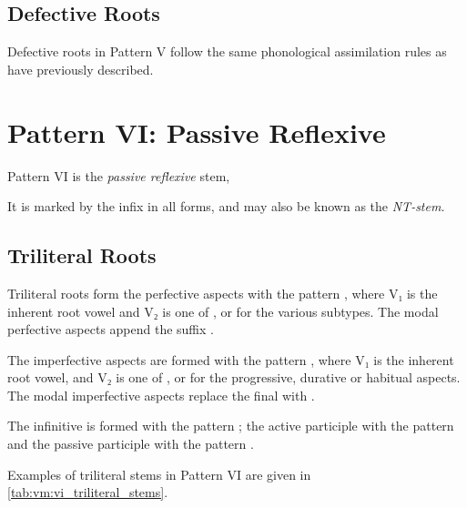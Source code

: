 \documentclass[grammar]{subfiles}
\begin{document}
\subsection{Defective Roots}
\label{ssec:vm:v_defective_roots}

Defective roots in Pattern V follow the same phonological assimilation rules
as have previously described. 


\clearpage
\section{Pattern VI: Passive Reflexive}
\label{sec:vm:pattern_vi}

Pattern VI is the \emph{passive reflexive} stem, 
%

It is marked by the infix  in all forms, and may also be known as the \emph{NT-stem}.


\subsection{Triliteral Roots}
\label{ssec:vm:vi_triliteral_roots}

Triliteral roots form the perfective aspects with the pattern
, where V₁ is the inherent root vowel and V₂ is one of
,  or  for the various subtypes.  The modal perfective
aspects append the suffix .

The imperfective aspects are formed with the pattern ,
where V₁ is the inherent root vowel, and V₂ is one of ,  or
 for the progressive, durative or habitual aspects.  The modal
imperfective aspects replace the final  with .

The infinitive is formed with the pattern ; the active participle
with the pattern  and the passive participle with the pattern
. 

Examples of triliteral stems in Pattern VI are given in \cref{tab:vm:vi_triliteral_stems}. 
\end{document}
